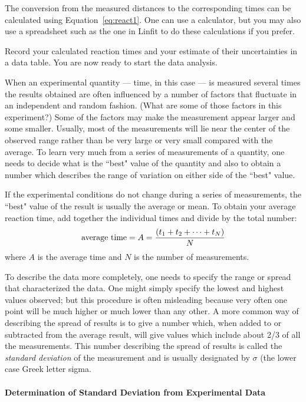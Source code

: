      The conversion from the measured distances to the
corresponding times can be calculated using Equation~\ref{eq:react1}.
One can use a calculator, but you may also use a spreadsheet such as
the one in Linfit to do these calculations if you prefer.

     Record your calculated reaction times and your estimate of
their uncertainties in a data table.  You are now ready to start
the data analysis.

     When an experimental quantity --- time, in this case --- is
measured several times the results obtained are often influenced
by a number of factors that fluctuate in an independent and random
fashion.
(What are some of those factors in this experiment?)  Some of the
factors may make the measurement appear larger and some smaller.
Usually, most of the measurements will lie near
the center of the observed range rather than be very large or
very small compared with the average.  To learn very much from a
series of measurements of a quantity, one needs to decide what is
the ``best" value of the quantity and also to obtain a number
which describes the range of variation on either side of the
``best" value.

     If the experimental conditions do not change during a series of
measurements, the ``best" value of the result is usually the
average or mean.  To obtain your average reaction time, add
together the individual times and divide by the total number:
\begin{equation}
\mbox{average time} = A = {{(t_{1} + t_{2} + \cdots + t_{N})} \over {N}}
   \label{eq:react2}
\end{equation}
where $A$ is the average time and $N$ is the number of measurements.

     To describe the data more completely, one
needs to specify the range or spread that characterized the data.  One
might simply specify the lowest and highest values observed; but this
procedure is often misleading because very often one point will
be much higher or much lower than any other.  A more common way
of describing the spread of results is to give a number which,
when added to or subtracted from the average result, will give
values which include about 2/3 of all the measurements.  This
number describing the spread of results is called the {\em standard
deviation} of the measurement and is usually designated by $\sigma$
(the lower case Greek letter sigma.

\paragraph*{Determination of Standard Deviation from Experimental Data}

